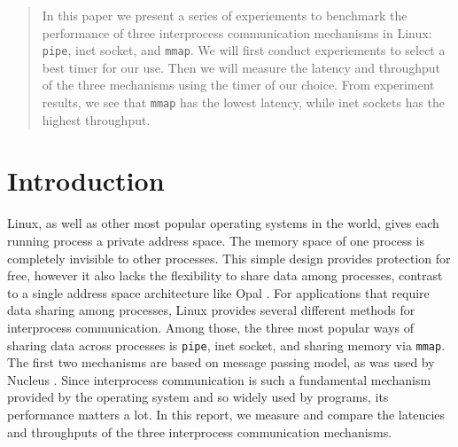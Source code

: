 \documentclass[11pt,conference]{IEEEtran}
\begin{document}
\begin{abstract}
    In this paper we present a series of experiements to benchmark the performance of three interprocess communication mechanisms in Linux: \texttt{pipe}, inet socket, and \texttt{mmap}.
    We will first conduct experiements to select a best timer for our use.
    Then we will measure the latency and throughput of the three mechanisms using the timer of our choice.
    From experiment results, we see that \texttt{mmap} has the lowest latency, while inet sockets has the highest throughput.
\end{abstract}





%
\IEEEpeerreviewmaketitle

\section{Introduction}
Linux, as well as other most popular operating systems in the world, gives each running process a private address space.
The memory space of one process is completely invisible to other processes.
This simple design provides protection for free, however it also lacks the flexibility to share data among processes, contrast to a single address space architecture like Opal \cite{chase1994sharing}.
For applications that require data sharing among processes, Linux provides several different methods for interprocess communication.
Among those, the three most popular ways of sharing data across processes is \texttt{pipe}, inet socket, and sharing memory via \texttt{mmap}.
The first two mechanisms are based on message passing model, as was used by Nucleus \cite{hansen1970nucleus}.
Since interprocess communication is such a fundamental mechanism provided by the operating system and so widely used by programs, its performance matters a lot.
In this report, we measure and compare the latencies and throughputs of the three interprocess communication mechanisms.
\end{document}

